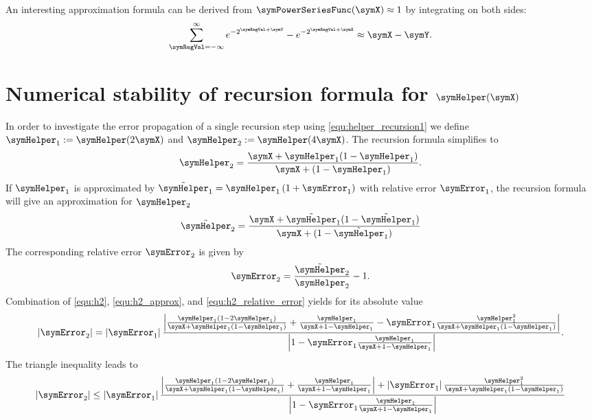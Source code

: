 \documentclass[a4paper]{scrartcl}
\begin{document}
An interesting approximation formula can be derived from $\symPowerSeriesFunc(\symX) \approx 1$ by integrating on both sides: 
\begin{equation}
\label{equ:approx_formula}
\sum_{\symRegVal = -\infty}^\infty
e^{-2^{\symRegVal+\symY}} - e^{-2^{\symRegVal+\symX}} \approx \symX - \symY.
\end{equation}

\section{Numerical stability of recursion formula for $\symHelper(\symX)$}
\label{app:helper_stable}
In order to investigate the error propagation of a single recursion step using \eqref{equ:helper_recursion1} we define $\symHelper_1 := \symHelper(2\symX)$ and $\symHelper_2 := \symHelper(4\symX)$. The recursion formula simplifies to
\begin{equation}
\label{equ:h2}
\symHelper_2 = \frac{\symX+\symHelper_1(1-\symHelper_1)}{\symX+(1-\symHelper_1)}.
\end{equation}
If $\symHelper_1$ is approximated by $\tilde{\symHelper}_1 = \symHelper_1\left(1+\symError_1\right)$ with relative error $\symError_1$, the recursion formula will give an approximation for $\symHelper_2$
\begin{equation}
\label{equ:h2_approx}
\tilde{\symHelper}_2 = 
\frac{\symX+\tilde{\symHelper}_1(1-\tilde{\symHelper}_1)}{\symX+(1-\tilde{\symHelper}_1)}
\end{equation}
The corresponding relative error $\symError_2$ is given by
\begin{equation}
\label{equ:h2_relative_error}
\symError_2 = \frac{\tilde{\symHelper}_2}{\symHelper_2}-1.
\end{equation}
Combination of \eqref{equ:h2}, \eqref{equ:h2_approx}, and \eqref{equ:h2_relative_error} yields for its absolute value
\begin{equation}
\left|\symError_2\right|
=
\left|\symError_1\right|
\frac{
\left|
\frac{\symHelper_1\left(1-2\symHelper_1\right)}{\symX+\symHelper_1\left(1-\symHelper_1\right)}
+
\frac{\symHelper_1}{\symX+1-\symHelper_1}
-
\symError_1
\frac{\symHelper_1^2}{\symX+\symHelper_1\left(1-\symHelper_1\right)}
\right|
}{
\left|
1-
\symError_1
\frac{\symHelper_1}{\symX+1-\symHelper_1}
\right|
}.
\end{equation}
The triangle inequality leads to
\begin{equation}
\left|\symError_2\right|
\leq
\left|\symError_1\right|
\frac{
\left|
\frac{\symHelper_1\left(1-2\symHelper_1\right)}{\symX+\symHelper_1\left(1-\symHelper_1\right)}
+
\frac{\symHelper_1}{\symX+1-\symHelper_1}
\right|
+
\left|
\symError_1
\right|
\frac{\symHelper_1^2}{\symX+\symHelper_1\left(1-\symHelper_1\right)}
}{
\left|
1-
\symError_1
\frac{\symHelper_1}{\symX+1-\symHelper_1}
\right|
}
\end{equation}
\end{document}
